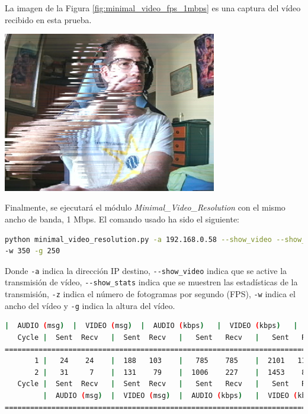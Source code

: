La imagen de la Figura \ref{fig:minimal_video_fps_1mbps} es una captura del vídeo recibido en esta prueba.
\begin{center}
  \includegraphics[width = 0.7\textwidth]{images/VideoRecibido1.2.png}
  \label{fig:minimal_video_fps_1mbps}
\end{center}

\newpage

Finalmente, se ejecutará el módulo \textit{Minimal\_Video\_Resolution} con el mismo ancho de banda, 1 Mbps. El comando usado ha sido el siguiente:
\begin{lstlisting}[language=bash,basicstyle=\ttfamily\scriptsize]
python minimal_video_resolution.py -a 192.168.0.58 --show_video --show_stats -z 12 \\
-w 350 -g 250
\end{lstlisting}
Donde \verb|-a| indica la dirección IP destino, \verb|--show_video| indica que se active la transmisión de vídeo, \verb|--show_stats| indica que se muestren las estadísticas de la transmisión, \verb|-z| indica el número de fotogramas por segundo (FPS), \verb|-w| indica el ancho del vídeo y \verb|-g| indica la altura del vídeo.
\vspace{\baselineskip}

\begin{lstlisting}[language=bash,basicstyle=\ttfamily\tiny]
         |  AUDIO (msg)  |  VIDEO (msg)  |  AUDIO (kbps)   |  VIDEO (kbps)   |     CPU (%) 
   Cycle |  Sent  Recv   |  Sent  Recv   |   Sent   Recv   |   Sent   Recv   | Program System
================================================================================================
       1 |   24    24    |  188   103    |   785    785    |  2101   1152    |  20      0       
       2 |   31     7    |  131    79    |  1006    227    |  1453    876    |  23     70       
   Cycle |  Sent  Recv   |  Sent  Recv   |   Sent   Recv   |   Sent   Recv   | Program System
         |  AUDIO (msg)  |  VIDEO (msg)  |  AUDIO (kbps)   |  VIDEO (kbps)   |     CPU (%) 
===========================================================================================
\end{lstlisting}

